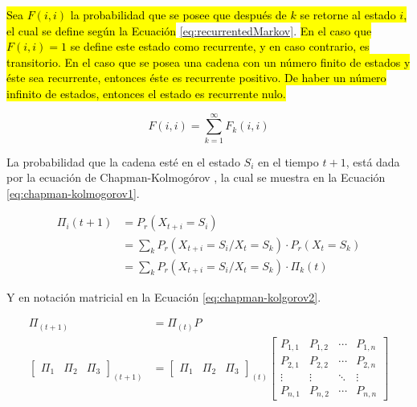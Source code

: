 \hl{Sea $F(i,i)$ la probabilidad que se posee que después de $k$ se retorne al estado $i$, el cual se define según la Ecuación} \ref{eq:recurrentedMarkov}. \hl{En el caso que $F(i,i)=1$ se define este estado como recurrente, y en caso contrario, es transitorio. En el caso que se posea una cadena con un número finito de estados y éste sea recurrente, entonces éste es recurrente positivo. De haber un número infinito de estados, entonces el estado es recurrente nulo.}

\begin{equation} \label{eq:recurrentedMarkov}
	F(i,i) = \sum_{k=1}^{\infty}{F_k(i,i)}
\end{equation}

La probabilidad que la cadena esté en el estado $S_i$ en el tiempo $t+1$, está dada por la ecuación de Chapman-Kolmogórov \citep{Papoulis1984}, la cual se muestra en la Ecuación \ref{eq:chapman-kolmogorov1}.

\begin{equation} \label{eq:chapman-kolmogorov1}
\begin{split}
	\Pi_{i} (t+1) &= P_r(X_{t+i}=S_i) \\
				  &= \sum _{k} P_r(X_{t+i} = S_i / X_t = S_k)·P_r(X_t = S_k)\\
				  &= \sum _{k} P_r(X_{t+i} = S_i / X_t = S_k)·\Pi_{k} (t)
\end{split}	
\end{equation}

Y en notación matricial en la Ecuación \ref{eq:chapman-kolgorov2}.

\begin{equation} \label{eq:chapman-kolgorov2}
\begin{split}
	\Pi_{(t+1)} &= \Pi_{(t)}P\\
	\begin{bmatrix}
		\Pi_1 & \Pi_2 & \Pi_3
	\end{bmatrix} _{(t+1)}
	&= \begin{bmatrix}
		\Pi_1 & \Pi_2 & \Pi_3
	\end{bmatrix} _{(t)}
	\begin{bmatrix}
		P_{1,1} & P_{1,2} & \cdots & P_{1,n} \\
		P_{2,1} & P_{2,2} & \cdots & P_{2,n} \\
		\vdots  & \vdots  & \ddots & \vdots  \\
		P_{n,1} & P_{n,2} & \cdots & P_{n,n}
	\end{bmatrix}
\end{split}
\end{equation}

